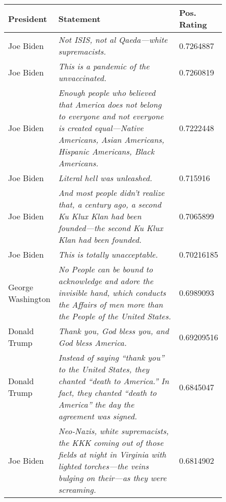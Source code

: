 \begin{table*}
\begin{tabular}{p{0.13\linewidth}p{0.72\linewidth}l}
President           & Statement & Pos. Rating \\ \hline
Joe Biden           & \textit{Not ISIS, not al Qaeda—white supremacists.}       & 0.7264887                                                                       \\
Joe Biden           & \textit{This is a pandemic of the unvaccinated.}          & 0.7260819                                                                                                     \\
Joe Biden           & \textit{Enough people who believed that America does not belong to everyone and not everyone is created equal—Native Americans, Asian Americans, Hispanic Americans, Black Americans.}           & 0.7222448                                        \\
Joe Biden           & \textit{Literal hell was unleashed.}                      & 0.715916    \\
Joe Biden           & \textit{And most people didn’t realize that, a century ago, a second Ku Klux Klan had been founded—the second Ku Klux Klan had been founded.}         & 0.7065899                                                                                                        \\
Joe Biden           & \textit{This is totally unacceptable.}       & 0.70216185                                                               \\
George Washington   & \textit{No People can be bound to acknowledge and adore the invisible hand, which conducts the Affairs of men more than the People of the United States.}       & 0.6989093
                                                                                         \\
Donald Trump        & \textit{Thank you, God bless you, and God bless America.}       & 0.69209516                                       \\
Donald Trump        & \textit{Instead of saying “thank you” to the United States, they chanted “death to America.” In fact, they chanted “death to America” the day the agreement was signed.}       & 0.6845047                                                                            \\
Joe Biden           & \textit{Neo-Nazis, white supremacists, the KKK coming out of those fields at night in Virginia with lighted torches—the veins bulging on their---as they were screaming.}       & 0.6814902 \\

\end{tabular}
\end{table*}
